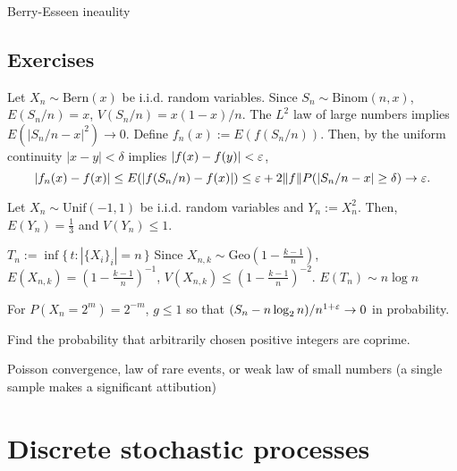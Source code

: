 \documentclass{../../large}
\newcommand{\Unif}{\mathrm{Unif}}
\newcommand{\Bern}{\mathrm{Bern}}
\newcommand{\Binom}{\mathrm{Binom}}
\newcommand{\Geo}{\mathrm{Geo}}
\begin{document}

Berry-Esseen ineaulity






\section*{Exercises}
\begin{prb}
Let $X_n\sim\Bern(x)$ be i.i.d. random variables.
Since $S_n\sim\Binom(n,x)$, $E(S_n/n)=x$, $V(S_n/n)=x(1-x)/n$.
The $L^2$ law of large numbers implies $E(|S_n/n-x|^2)\to0$.
Define $f_n(x):=E(f(S_n/n))$.
Then, by the uniform continuity $|x-y|<\delta$ implies $|f(x)-f(y)|<\varepsilon$,
\[|f_n(x)-f(x)|\le E(|f(S_n/n)-f(x)|)\le\varepsilon+2\|f\|P(|S_n/n-x|\ge\delta)\to\varepsilon.\]
\end{prb}
\begin{prb}
Let $X_n\sim\Unif(-1,1)$ be i.i.d. random variables and $Y_n:=X_n^2$.
Then, $E(Y_n)=\frac13$ and $V(Y_n)\le1$.
\end{prb}
\begin{prb}
$T_n:=\inf\{\,t:|\{X_i\}_i|=n\,\}$
Since $X_{n,k}\sim\Geo(1-\frac{k-1}n)$, $E(X_{n,k})=(1-\frac{k-1}n)^{-1}$, $V(X_{n,k})\le(1-\frac{k-1}n)^{-2}$.
$E(T_n)\sim n\log n$
\end{prb}
\begin{prb}
\end{prb}
\begin{prb}
For $P(X_n=2^m)=2^{-m}$, $g\le1$ so that $(S_n-n\log_2n)/n^{1+\varepsilon}\to0$ in probability.
\end{prb}

\begin{prb}
\end{prb}

\begin{prb}
Find the probability that arbitrarily chosen positive integers are coprime.
\end{prb}
Poisson convergence, law of rare events, or weak law of small numbers (a single sample makes a significant attibution)









\chapter{Discrete stochastic processes}
\end{document}
